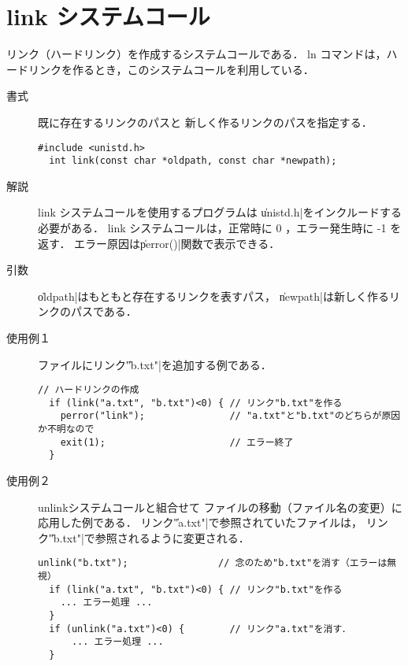 \section{link システムコール}
リンク（ハードリンク）を作成するシステムコールである．
ln コマンドは，ハードリンクを作るとき，このシステムコールを利用している．

\begin{description}
\item[書式] 既に存在するリンクのパスと
新しく作るリンクのパスを指定する．
\begin{lstlisting}[numbers=none]
  #include <unistd.h>
  int link(const char *oldpath, const char *newpath);
\end{lstlisting}

\item[解説] link システムコールを使用するプログラムは
\|unistd.h|をインクルードする必要がある．
link システムコールは，正常時に 0 ，エラー発生時に -1 を返す．
エラー原因は\|perror()|関数で表示できる．

\item[引数] \|oldpath|はもともと存在するリンクを表すパス，
  \|newpath|は新しく作るリンクのパスである．

\item[使用例１] ファイルにリンク\|"b.txt"|を追加する例である．
\begin{lstlisting}[numbers=none]
  // ハードリンクの作成
  if (link("a.txt", "b.txt")<0) { // リンク"b.txt"を作る
    perror("link");               // "a.txt"と"b.txt"のどちらが原因か不明なので
    exit(1);                      // エラー終了
  }
\end{lstlisting}

\item[使用例２]unlinkシステムコールと組合せて
ファイルの移動（ファイル名の変更）に応用した例である．
リンク\|"a.txt"|で参照されていたファイルは，
リンク\|"b.txt"|で参照されるように変更される．
\begin{lstlisting}[numbers=none]
  unlink("b.txt");                // 念のため"b.txt"を消す（エラーは無視）
  if (link("a.txt", "b.txt")<0) { // リンク"b.txt"を作る
    ... エラー処理 ... 
  }
  if (unlink("a.txt")<0) {        // リンク"a.txt"を消す．
      ... エラー処理 ... 
  }
\end{lstlisting}
\end{description}

